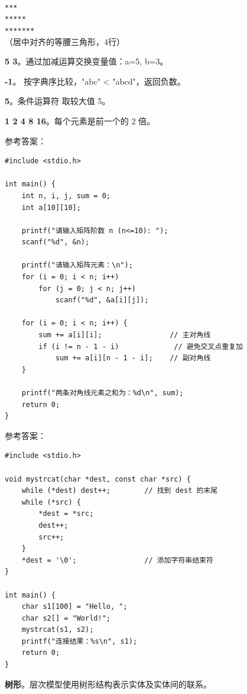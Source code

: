 \documentclass[a4paper,11pt]{article}
\begin{document}
\q
\texttt{\quad*}\\
\texttt{***}\\
\texttt{*****}\\
\texttt{*******}\\
（居中对齐的等腰三角形，4行）

\q \textbf{5 3}。通过加减运算交换变量值：a=5, b=3。

\q \textbf{-1}。 按字典序比较，"abc" < "abcd"，返回负数。

\q \textbf{5}。条件运算符  取较大值 5。

\q \textbf{1 2 4 8 16}。每个元素是前一个的 2 倍。


\pq 参考答案：
\begin{lstlisting}[language={[custom]C}]
#include <stdio.h>

int main() {
    int n, i, j, sum = 0;
    int a[10][10];

    printf("请输入矩阵阶数 n (n<=10): ");
    scanf("%d", &n);

    printf("请输入矩阵元素：\n");
    for (i = 0; i < n; i++)
        for (j = 0; j < n; j++)
            scanf("%d", &a[i][j]);

    for (i = 0; i < n; i++) {
        sum += a[i][i];                // 主对角线
        if (i != n - 1 - i)             // 避免交叉点重复加
            sum += a[i][n - 1 - i];    // 副对角线
    }

    printf("两条对角线元素之和为：%d\n", sum);
    return 0;
}
\end{lstlisting}

\pq 参考答案：
\begin{lstlisting}[language={[custom]C}]
#include <stdio.h>

void mystrcat(char *dest, const char *src) {
    while (*dest) dest++;        // 找到 dest 的末尾
    while (*src) {
        *dest = *src;
        dest++;
        src++;
    }
    *dest = '\0';                // 添加字符串结束符
}

int main() {
    char s1[100] = "Hello, ";
    char s2[] = "World!";
    mystrcat(s1, s2);
    printf("连接结果：%s\n", s1);
    return 0;
}
\end{lstlisting}



\q \textbf{树形}。层次模型使用树形结构表示实体及实体间的联系。
\end{document}

